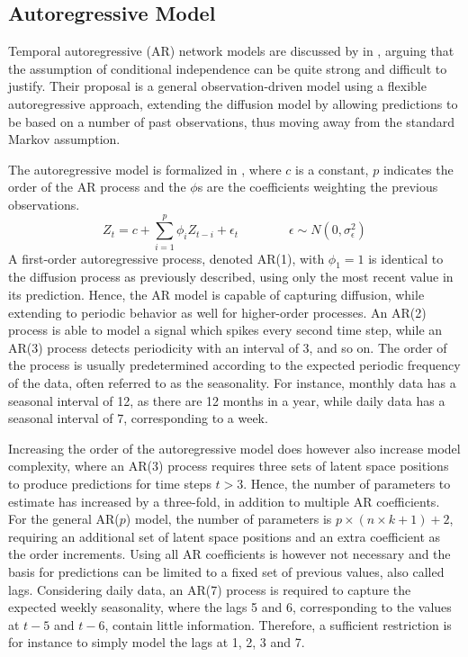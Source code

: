     
    \subsection{Autoregressive Model}
    
        Temporal autoregressive (AR) network models are discussed by \citeauthor{sewell2018simultaneous} in \cite{sewell2018simultaneous}, arguing that the assumption of conditional independence can be quite strong and difficult to justify. Their proposal is a general observation-driven model using a flexible autoregressive approach, extending the diffusion model by allowing predictions to be based on a number of past observations, thus moving away from the standard Markov assumption. 
        
        The autoregressive model is formalized in , where $c$ is a constant, $p$ indicates the order of the AR process and the $\phi$s are the coefficients weighting the previous observations. 
        \begin{equation}\label{eq:ar-model}
            Z_t = c + \sum_{i=1}^p \phi_i Z_{t-i} + \epsilon_t \qquad\qquad \epsilon \sim N(0,\sigma_\epsilon^2)
        \end{equation}
        A first-order autoregressive process, denoted AR(1), with $\phi_1=1$ is identical to the diffusion process as previously described, using only the most recent value in its prediction. Hence, the AR model is capable of capturing diffusion, while extending to periodic behavior as well for higher-order processes. An AR(2) process is able to model a signal which spikes every second time step, while an AR(3) process detects periodicity with an interval of 3, and so on. The order of the process is usually predetermined according to the expected periodic frequency of the data, often referred to as the seasonality. For instance, monthly data has a seasonal interval of 12, as there are 12 months in a year, while daily data has a seasonal interval of 7, corresponding to a week.
        
        Increasing the order of the autoregressive model does however also increase model complexity, where an AR(3) process requires three sets of latent space positions to produce predictions for time steps $t>3$. Hence, the number of parameters to estimate has increased by a three-fold, in addition to multiple AR coefficients. For the general AR($p$) model, the number of parameters is $p\times (n\times k + 1) + 2$, requiring an additional set of latent space positions and an extra coefficient as the order increments.
        Using all AR coefficients is however not necessary and the basis for predictions can be limited to a fixed set of previous values, also called lags. Considering daily data, an AR(7) process is required to capture the expected weekly seasonality, where the lags 5 and 6, corresponding to the values at $t-5$ and $t-6$, contain little information. Therefore, a sufficient restriction is for instance to simply model the lags at 1, 2, 3 and 7.
        
